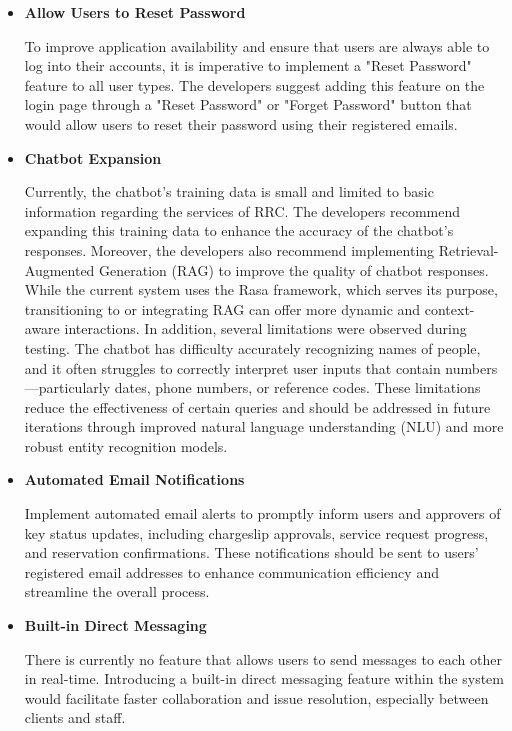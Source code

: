 \begin{itemize}
	
	\item \textbf{Allow Users to Reset Password}
	
	To improve application availability and ensure that users are always able to log into their accounts, it is imperative to implement a "Reset Password" feature to all user types. The developers suggest adding this feature on the login page through a "Reset Password" or "Forget Password" button that would allow users to reset their password using their registered emails.
	
	\item \textbf{Chatbot Expansion}
	
	Currently, the chatbot's training data is small and limited to basic information regarding the services of RRC. The developers recommend expanding this training data to enhance the accuracy of the chatbot's responses. Moreover, the developers also recommend implementing Retrieval-Augmented Generation (RAG) to improve the quality of chatbot responses. While the current system uses the Rasa framework, which serves its purpose, transitioning to or integrating RAG can offer more dynamic and context-aware interactions. In addition, several limitations were observed during testing. The chatbot has difficulty accurately recognizing names of people, and it often struggles to correctly interpret user inputs that contain numbers—particularly dates, phone numbers, or reference codes. These limitations reduce the effectiveness of certain queries and should be addressed in future iterations through improved natural language understanding (NLU) and more robust entity recognition models.
	
	\item \textbf{Automated Email Notifications}
	
	Implement automated email alerts to promptly inform users and approvers of key status updates, including chargeslip approvals, service request progress, and reservation confirmations. These notifications should be sent to users' registered email addresses to enhance communication efficiency and streamline the overall process.
	
	\item \textbf{Built-in Direct Messaging}
	
	There is currently no feature that allows users to send messages to each other in real-time. Introducing a built-in direct messaging feature within the system would facilitate faster collaboration and issue resolution, especially between clients and staff.
	

\end{itemize}
